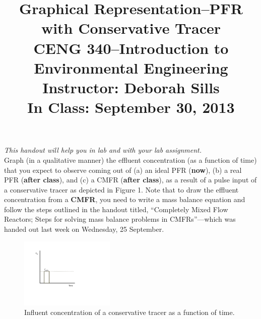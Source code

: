 \documentclass[11pt,letterpaper]{article}
\begin{document}
\setlength{\parindent}{0cm} 



\frenchspacing

\setlength{\textwidth}{6.25in}

\title {\Large{\textbf{Graphical Representation--PFR with Conservative Tracer}}\\ \large{CENG 340--Introduction to Environmental Engineering\\
Instructor: Deborah Sills\\ \textbf{In Class: September 30, 2013}}}

\author {}
\date {}
\maketitle

\vspace{-1.5cm}
\emph{This handout will help you in lab and with your lab assignment.}\\

Graph (in a qualitative manner) the effluent concentration (as a function of time) that you expect to observe coming out of (a) an ideal PFR (\textbf{now}), (b) a real PFR (\textbf{after class}), and (c) a CMFR (\textbf{after class}), as a result of a pulse input of a conservative tracer as depicted in Figure 1.  Note that to draw the effluent concentration from a \textbf{CMFR}, you need to write a mass balance equation and follow the steps outlined in the handout titled, ``Completely Mixed Flow Reactors; Steps for solving mass balance problems in CMFRs''---which was handed out last week on Wednesday, 25 September.

\begin{figure}
\centering
\includegraphics[width=0.4\textwidth]{C_in}
\caption{Influent concentration of a conservative tracer as a function of time.}
\end{figure}
\end{document}
